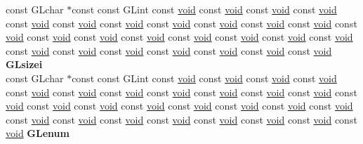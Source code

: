 \begin{DoxyCompactItemize}
\begin{tabbing}
\>const GLchar $\ast$const const GLint const \hyperlink{interfacevoid}{void} const \hyperlink{interfacevoid}{void} const \hyperlink{interfacevoid}{void} const \hyperlink{interfacevoid}{void} const \hyperlink{interfacevoid}{void} const \hyperlink{interfacevoid}{void} const \hyperlink{interfacevoid}{void} const \hyperlink{interfacevoid}{void} const \hyperlink{interfacevoid}{void} const \hyperlink{interfacevoid}{void} const \hyperlink{interfacevoid}{void} const \hyperlink{interfacevoid}{void} const \hyperlink{interfacevoid}{void} const \hyperlink{interfacevoid}{void} const \hyperlink{interfacevoid}{void} const \hyperlink{interfacevoid}{void} const \hyperlink{interfacevoid}{void} const \hyperlink{interfacevoid}{void} const \hyperlink{interfacevoid}{void} const \hyperlink{interfacevoid}{void} const \hyperlink{interfacevoid}{void} const \hyperlink{interfacevoid}{void} const \hyperlink{interfacevoid}{void} const \hyperlink{interfacevoid}{void} const \hyperlink{interfacevoid}{void} const \hyperlink{interfacevoid}{void} {\bfseries GLsizei}\\
\>const GLchar $\ast$const const GLint const \hyperlink{interfacevoid}{void} const \hyperlink{interfacevoid}{void} const \hyperlink{interfacevoid}{void} const \hyperlink{interfacevoid}{void} const \hyperlink{interfacevoid}{void} const \hyperlink{interfacevoid}{void} const \hyperlink{interfacevoid}{void} const \hyperlink{interfacevoid}{void} const \hyperlink{interfacevoid}{void} const \hyperlink{interfacevoid}{void} const \hyperlink{interfacevoid}{void} const \hyperlink{interfacevoid}{void} const \hyperlink{interfacevoid}{void} const \hyperlink{interfacevoid}{void} const \hyperlink{interfacevoid}{void} const \hyperlink{interfacevoid}{void} const \hyperlink{interfacevoid}{void} const \hyperlink{interfacevoid}{void} const \hyperlink{interfacevoid}{void} const \hyperlink{interfacevoid}{void} const \hyperlink{interfacevoid}{void} const \hyperlink{interfacevoid}{void} const \hyperlink{interfacevoid}{void} const \hyperlink{interfacevoid}{void} const \hyperlink{interfacevoid}{void} const \hyperlink{interfacevoid}{void} const \hyperlink{interfacevoid}{void} {\bfseries GLenum}\\

\end{tabbing}
\end{DoxyCompactItemize}
